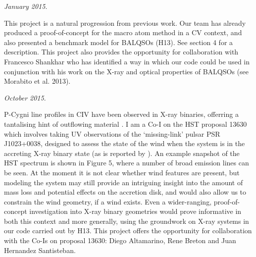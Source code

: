 \documentclass[useAMS,usenatbib,onecolumn]{mn2e2}
\begin{document}
\bigskip


 {\sl January 2015}.

 This project is a natural progression from previous work. Our team 
has already produced a proof-of-concept for the macro atom method in a CV context, and 
also presented a benchmark model for BALQSOs (H13). See section 4 for a description. This project
also provides the opportunity for collaboration with Francesco Shankhar who has identified
a way in which our code could be used in conjunction with his work
on the X-ray and optical properties of BALQSOs (see Morabito et al. 2013\nocite{morabito2013}).

\bigskip


  {\sl October 2015}.

 P-Cygni line profiles in CIV have been observed in X-ray binaries,
offerring a tantalising hint of outflowing material \citep{ioannau2003}. I am a Co-I on the HST proposal 13630 which involves taking UV observations of the `missing-link' pulsar PSR J1023+0038, designed to assess the state of the wind when the system is in the accreting 
X-ray binary state (as is reported by \citealt{Patruno2014}). An example snapshot of the HST spectrum is shown in Figure 5, where a number of broad
emission lines can be seen.
At the moment it is not clear whether wind features are present, but modeling the system may still
provide an intriguing insight 
into the amount of mass loss and potential effects on the accretion disk, and would also
allow us to constrain the wind geometry, if a wind exists. Even a wider-ranging, proof-of-concept investigation into
X-ray binary geometries would prove informative in both this context and more generally, using the groundwork
on X-ray systems in our code carried out by H13. This project offers the opportunity 
for collaboration with the Co-Is on proposal 13630: Diego Altamarino, Rene Breton
and Juan Hernandez Santisteban.
\end{document}
